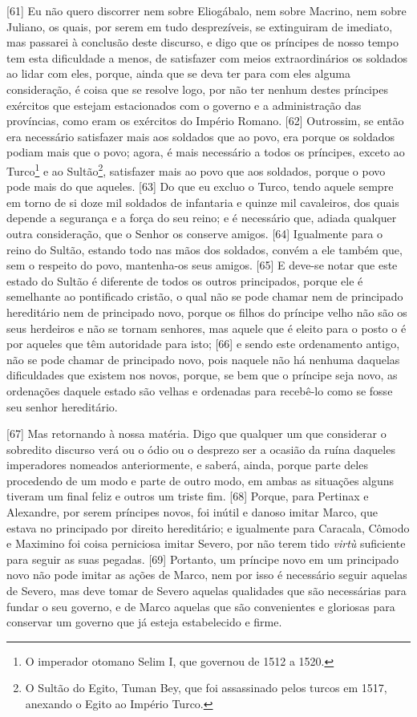 {[}61{]} Eu não quero discorrer nem sobre Eliogábalo, nem sobre Macrino,
nem sobre Juliano, os quais, por serem em tudo desprezíveis, se
extinguiram de imediato, mas passarei à conclusão deste discurso, e digo
que os príncipes de nosso tempo tem esta dificuldade a menos, de
satisfazer com meios extraordinários os soldados ao lidar com eles,
porque, ainda que se deva ter para com eles alguma consideração, é coisa
que se resolve logo, por não ter nenhum destes príncipes exércitos que
estejam estacionados com o governo e a administração das províncias,
como eram os exércitos do Império Romano. {[}62{]} Outrossim, se então
era necessário satisfazer mais aos soldados que ao povo, era porque os
soldados podiam mais que o povo; agora, é mais necessário a todos os
príncipes, exceto ao Turco\footnote{O imperador otomano Selim I, que
  governou de 1512 a 1520.} e ao Sultão\footnote{O Sultão do Egito,
  Tuman Bey, que foi assassinado pelos turcos em 1517, anexando o Egito
  ao Império Turco.}, satisfazer mais ao povo que aos soldados, porque o
povo pode mais do que aqueles. {[}63{]} Do que eu excluo o Turco, tendo
aquele sempre em torno de si doze mil soldados de infantaria e quinze
mil cavaleiros, dos quais depende a segurança e a força do seu reino; e
é necessário que, adiada qualquer outra consideração, que o Senhor os
conserve amigos. {[}64{]} Igualmente para o reino do Sultão, estando
todo nas mãos dos soldados, convém a ele também que, sem o respeito do
povo, mantenha-os seus amigos. {[}65{]} E deve-se notar que este estado
do Sultão é diferente de todos os outros principados, porque ele é
semelhante ao pontificado cristão, o qual não se pode chamar nem de
principado hereditário nem de principado novo, porque os filhos do
príncipe velho não são os seus herdeiros e não se tornam senhores, mas
aquele que é eleito para o posto o é por aqueles que têm autoridade para
isto; {[}66{]} e sendo este ordenamento antigo, não se pode chamar de
principado novo, pois naquele não há nenhuma daquelas dificuldades que
existem nos novos, porque, se bem que o príncipe seja novo, as
ordenações daquele estado são velhas e ordenadas para recebê-lo como se
fosse seu senhor hereditário.

{[}67{]} Mas retornando à nossa matéria. Digo que qualquer um que
considerar o sobredito discurso verá ou o ódio ou o desprezo ser a
ocasião da ruína daqueles imperadores nomeados anteriormente, e saberá,
ainda, porque parte deles procedendo de um modo e parte de outro modo,
em ambas as situações alguns tiveram um final feliz e outros um triste
fim. {[}68{]} Porque, para Pertinax e Alexandre, por serem príncipes
novos, foi inútil e danoso imitar Marco, que estava no principado por
direito hereditário; e igualmente para Caracala, Cômodo e Maximino foi
coisa perniciosa imitar Severo, por não terem tido \emph{virtù}
suficiente para seguir as suas pegadas. {[}69{]} Portanto, um príncipe
novo em um principado novo não pode imitar as ações de Marco, nem por
isso é necessário seguir aquelas de Severo, mas deve tomar de Severo
aquelas qualidades que são necessárias para fundar o seu governo, e de
Marco aquelas que são convenientes e gloriosas para conservar um governo
que já esteja estabelecido e firme.

